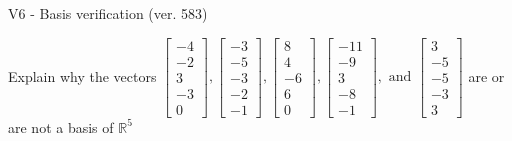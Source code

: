 \begin{exercise}
  \begin{exerciseTitle}V6 - Basis verification (ver. 583)\end{exerciseTitle}
  \begin{exerciseStatement}
    Explain why the vectors \(\left[\begin{array}{r}
-4 \\
-2 \\
3 \\
-3 \\
0
\end{array}\right] , \left[\begin{array}{r}
-3 \\
-5 \\
-3 \\
-2 \\
-1
\end{array}\right] , \left[\begin{array}{r}
8 \\
4 \\
-6 \\
6 \\
0
\end{array}\right] , \left[\begin{array}{r}
-11 \\
-9 \\
3 \\
-8 \\
-1
\end{array}\right] , \text{ and } \left[\begin{array}{r}
3 \\
-5 \\
-5 \\
-3 \\
3
\end{array}\right]\) are or are not a basis of \(\mathbb{R}^5\)	



\end{exerciseStatement}
\end{exercise}
